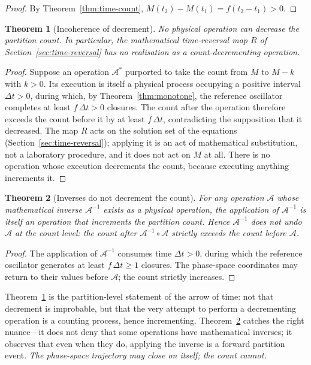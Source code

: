 \documentclass[11pt,a4paper]{article}
\theoremstyle{thmstyle}
\newtheorem{theorem}{Theorem}[section]
\theoremstyle{definition}
\theoremstyle{remark}
\newcommand{\Count}{M}
\newcommand{\Op}{\mathcal{A}}
\begin{document}
\begin{proof}
By Theorem~\ref{thm:time-count},
$\Count(t_{2})-\Count(t_{1})=f(t_{2}-t_{1})>0$.
\end{proof}

\begin{theorem}[Incoherence of decrement]
\label{thm:incoherence}
No physical operation can decrease the partition count. In particular,
the mathematical time-reversal map $R$ of
Section~\ref{sec:time-reversal} has no realisation as a
count-decrementing operation.
\end{theorem}

\begin{proof}
Suppose an operation $\Op^{*}$ purported to take the count from $\Count$
to $\Count-k$ with $k>0$. Its execution is itself a physical process
occupying a positive interval $\Delta t>0$, during which, by
Theorem~\ref{thm:monotone}, the reference oscillator completes at least
$f\,\Delta t>0$ closures. The count after the operation therefore exceeds
the count before it by at least $f\,\Delta t$, contradicting the
supposition that it decreased. The map $R$ acts on the solution set of
the equations (Section~\ref{sec:time-reversal}); applying it is an act of
mathematical substitution, not a laboratory procedure, and it does not
act on $\Count$ at all. There is no operation whose execution decrements
the count, because executing anything increments it.
\end{proof}

\begin{theorem}[Inverses do not decrement the count]
\label{thm:inverse}
For any operation $\Op$ whose mathematical inverse $\Op^{-1}$ exists as a
physical operation, the application of $\Op^{-1}$ is itself an operation
that increments the partition count. Hence $\Op^{-1}$ does not undo
$\Op$ at the count level: the count after $\Op^{-1}\circ\Op$ strictly
exceeds the count before $\Op$.
\end{theorem}

\begin{proof}
The application of $\Op^{-1}$ consumes time $\Delta t>0$, during which the
reference oscillator generates at least $f\,\Delta t\ge1$ closures. The
phase-space coordinates may return to their values before $\Op$; the
count strictly increases.
\end{proof}

Theorem~\ref{thm:incoherence} is the partition-level statement of the
arrow of time: not that decrement is improbable, but that the very
attempt to perform a decrementing operation is a counting process, hence
incrementing. Theorem~\ref{thm:inverse} catches the right nuance---it
does not deny that some operations have mathematical inverses; it
observes that even when they do, applying the inverse is a forward
partition event. \emph{The phase-space trajectory may close on itself;
the count cannot.}
\end{document}
